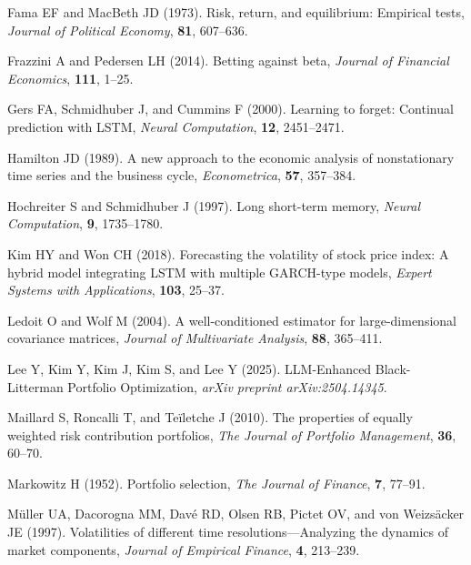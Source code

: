 \documentclass[eng]{kjas3}
\begin{document}
\begin{reference}
Fama EF and MacBeth JD (1973).
Risk, return, and equilibrium: Empirical tests,
\textit{Journal of Political Economy}, \textbf{81}, 607--636.

Frazzini A and Pedersen LH (2014).
Betting against beta,
\textit{Journal of Financial Economics}, \textbf{111}, 1--25.

Gers FA, Schmidhuber J, and Cummins F (2000).
Learning to forget: Continual prediction with LSTM,
\textit{Neural Computation}, \textbf{12}, 2451--2471.

Hamilton JD (1989).
A new approach to the economic analysis of nonstationary time series and the business cycle,
\textit{Econometrica}, \textbf{57}, 357--384.

Hochreiter S and Schmidhuber J (1997).
Long short-term memory,
\textit{Neural Computation}, \textbf{9}, 1735--1780.

Kim HY and Won CH (2018).
Forecasting the volatility of stock price index: A hybrid model integrating LSTM with multiple GARCH-type models,
\textit{Expert Systems with Applications}, \textbf{103}, 25--37.

Ledoit O and Wolf M (2004).
A well-conditioned estimator for large-dimensional covariance matrices,
\textit{Journal of Multivariate Analysis}, \textbf{88}, 365--411.

Lee Y, Kim Y, Kim J, Kim S, and Lee Y (2025).
LLM-Enhanced Black-Litterman Portfolio Optimization,
\textit{arXiv preprint arXiv:2504.14345}.

Maillard S, Roncalli T, and Te\"iletche J (2010).
The properties of equally weighted risk contribution portfolios,
\textit{The Journal of Portfolio Management}, \textbf{36}, 60--70.

Markowitz H (1952).
Portfolio selection,
\textit{The Journal of Finance}, \textbf{7}, 77--91.

M\"uller UA, Dacorogna MM, Dav\'e RD, Olsen RB, Pictet OV, and von Weizs\"acker JE (1997).
Volatilities of different time resolutions---Analyzing the dynamics of market components,
\textit{Journal of Empirical Finance}, \textbf{4}, 213--239.


\end{reference}
\end{document}
